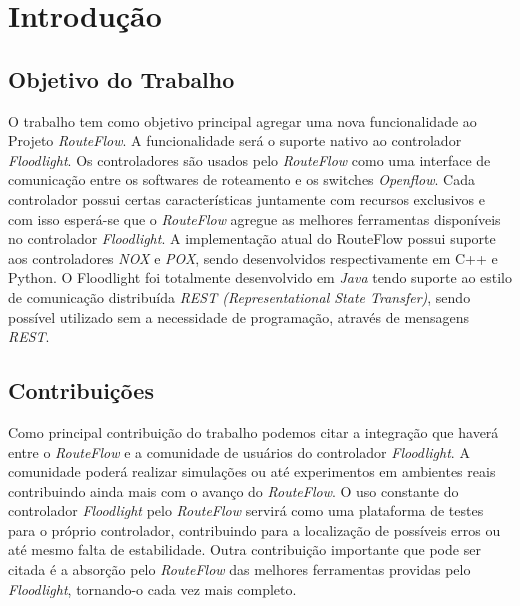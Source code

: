 \chapter{Introdução}

\section{Objetivo do Trabalho}
O trabalho tem como objetivo principal agregar uma
 nova funcionalidade ao Projeto \textit{RouteFlow}. A 
funcionalidade será o suporte nativo ao controlador 
\textit{Floodlight}. Os controladores são usados 
pelo 
\textit{RouteFlow} como uma interface de comunicação
 entre os softwares de roteamento e os switches 
\textit{Openflow}. Cada controlador possui certas
 características juntamente com recursos exclusivos e 
com isso esperá-se que o \textit{RouteFlow} agregue
 as melhores ferramentas disponíveis no controlador 
\textit{Floodlight}.
 A implementação atual do RouteFlow possui suporte
 aos controladores \textit{NOX} e \textit{POX}, sendo 
desenvolvidos respectivamente em C++ e Python. O
 Floodlight foi totalmente desenvolvido em \textit{Java} 
tendo suporte ao estilo de comunicação distribuída
 \textit{REST (Representational State Transfer)}, 
sendo possível utilizado sem a necessidade de programação,
  através de mensagens \textit{REST}.

\section{Contribuições}
Como principal contribuição do trabalho podemos citar
 a integração que haverá entre o \textit{RouteFlow} 
e a comunidade de usuários do controlador \textit{Floodlight}. 
A comunidade poderá realizar simulações 
ou até experimentos em ambientes reais contribuindo ainda
 mais com o avanço do \textit{RouteFlow}. O uso
constante do controlador \textit{Floodlight} pelo
 \textit{RouteFlow} servirá como uma plataforma de testes
para o próprio controlador, contribuindo para a localização de
 possíveis erros ou até mesmo falta de estabilidade.
Outra 
contribuição importante que pode ser citada é a absorção pelo
  \textit{RouteFlow} das melhores 
ferramentas providas pelo \textit{Floodlight}, tornando-o
 cada vez mais completo.  
